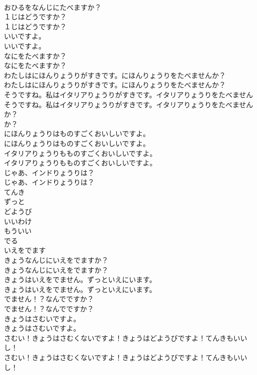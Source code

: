 \documentclass[8pt]{extreport}
\begin{document}
\begin{CJK}{UTF8}{min}
\\	おひるをなんじにたべますか？ 
\\	１じはどうですか？	
\\	１じはどうですか？ 
\\	いいですよ。	
\\	いいですよ。 
\\	なにをたべますか？	
\\	なにをたべますか？ 
\\	わたしはにほんりょうりがすきです。にほんりょうりをたべませんか？	
\\	わたしはにほんりょうりがすきです。にほんりょうりをたべませんか？ 
\\	そうですね。私はイタリアりょうりがすきです。イタリアりょうりをたべません	
\\	そうですね。私はイタリアりょうりがすきです。イタリアりょうりをたべません 
\\	か？	
\\	か？ 
\\	にほんりょうりはものすごくおいしいですよ。	
\\	にほんりょうりはものすごくおいしいですよ。 
\\	イタリアりょうりもものすごくおいしいですよ。	
\\	イタリアりょうりもものすごくおいしいですよ。 
\\	じゃあ、インドりょうりは？	
\\	じゃあ、インドりょうりは？ 
\\	てんき
\\	ずっと
\\	どようび
\\	いいわけ
\\	もういい
\\	でる
\\	いえをでます
\\	きょうなんじにいえをでますか？	
\\	きょうなんじにいえをでますか？ 
\\	きょうはいえをでません。ずっといえにいます。	
\\	きょうはいえをでません。ずっといえにいます。 
\\	でません！？なんでですか？	
\\	でません！？なんでですか？ 
\\	きょうはさむいですよ。	
\\	きょうはさむいですよ。 
\\	さむい！きょうはさむくないですよ！きょうはどようびですよ！てんきもいいし！	
\\	さむい！きょうはさむくないですよ！きょうはどようびですよ！てんきもいいし！ 

\end{CJK}
\end{document}
